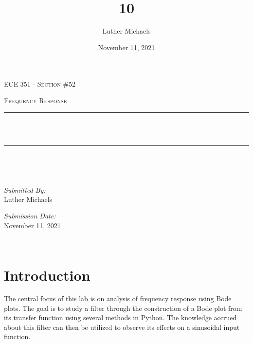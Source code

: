 \documentclass[12pt]{report}
\title{10}	%
\author{Luther Michaels}	%
\date{November 11, 2021}   %
\makeatletter
\let\thetitle\@title
\makeatother
\begin{document}
	
\begin{titlepage}
	\centering
	\vspace*{0.5 cm}
		
	\begin{center}    
		\textsc{\Large   ECE 351 - Section \#52}\\[2.0 cm]	
	\end{center}  
	\textsc{\Large Frequency Response  }\\[0.5 cm]
	\rule{\linewidth}{0.2 mm} \\[0.4 cm]
	{ \huge \bfseries \thetitle}\\
	\rule{\linewidth}{0.2 mm} \\[1.5 cm]
	\begin{minipage}{0.4\textwidth}
		\begin{flushleft} \large
		\end{flushleft}
	\end{minipage}~
	\begin{minipage}{0.4\textwidth}
		\begin{flushright} \large
			\emph{Submitted By:} \\
			Luther Michaels \break
			
			\emph{Submission Date:} \\
			November 11, 2021
		\end{flushright}
	\end{minipage}\\[2 cm]
\end{titlepage}
	

\tableofcontents
\pagebreak

\renewcommand{\thesection}{\arabic{section}}
\section{Introduction}
		  
The central focus of this lab is on analysis of frequency response using Bode plots. The goal is to study a filter through the construction of a Bode plot from its transfer function using several methods in Python. The knowledge accrued about this filter can then be utilized to observe its effects on a sinusoidal input function. \\
\end{document}
